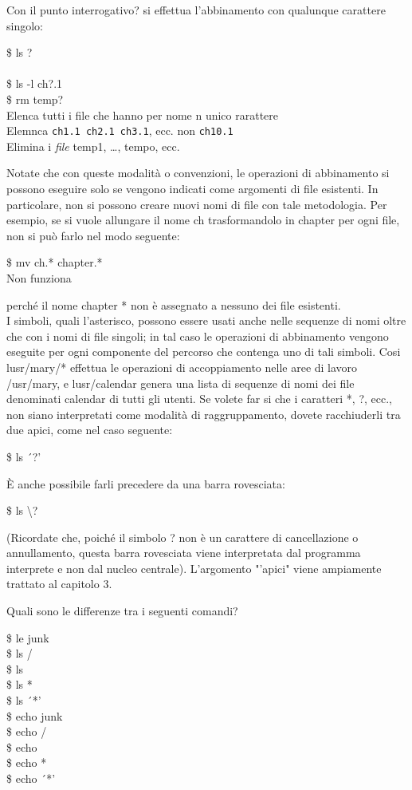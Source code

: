 Con il punto interrogativo? si effettua l'abbinamento con qualunque carattere singolo:
\begin{multicols}{2}
	\$ ls ?\\\\
	\$ ls -l ch?.1\\
	\$ rm temp?\\
	Elenca tutti i file che hanno per nome n unico rarattere\\
	Elemnca {\tt ch1.1 ch2.1 ch3.1}, ecc. non {\tt ch10.1}\\
	Elimina i \textit{file} temp1, \dots, tempo, ecc. 
\end{multicols}
Notate che con queste modalità o convenzioni, le operazioni di abbinamento si possono eseguire solo se vengono indicati come argomenti di file esistenti. In particolare,
non si possono creare nuovi nomi di file con tale metodologia. Per esempio, se si vuole allungare il nome ch trasformandolo in chapter per ogni file, non si può farlo nel
modo seguente:
\begin{multicols}{2}
	\$ mv ch.* chapter.*\\ Non funziona
\end{multicols}
perché il nome chapter * non è assegnato a nessuno dei file esistenti.\\
I simboli, quali l'asterisco, possono essere usati anche nelle sequenze di nomi oltre
che con i nomi di file singoli; in tal caso le operazioni di abbinamento vengono eseguite per ogni componente del percorso che contenga uno di tali simboli. Cosi
lusr/mary/* effettua le operazioni di accoppiamento nelle aree di lavoro /usr/mary, e
lusr/calendar genera una lista di sequenze di nomi dei file denominati calendar di tutti gli utenti.
Se volete far si che i caratteri *, ?, ecc., non siano interpretati come modalità di raggruppamento, dovete racchiuderli tra due apici, come nel caso seguente:
\begin{multicols}{2}
	\$ ls ´?'
\end{multicols}
È anche possibile farli precedere da una barra rovesciata:
\begin{multicols}{2}
	\$ ls \textbackslash?
\end{multicols}
(Ricordate che, poiché il simbolo ? non è un carattere di cancellazione o annullamento, questa barra rovesciata viene interpretata dal programma interprete e non dal nucleo centrale). L'argomento "'apici" viene ampiamente trattato al capitolo 3.
\begin{eser}
	Quali sono le differenze tra i seguenti comandi?\\
	\begin{multicols}{2}
		\$ le junk\\
		\$ ls /\\
		\$ ls\\
		\$ ls *\\
		\$ ls ´*'\\
		\$ echo junk\\
		\$ echo /\\
		\$ echo\\
		\$ echo *\\
		\$ echo ´*'
	\end{multicols}
\end{eser}
